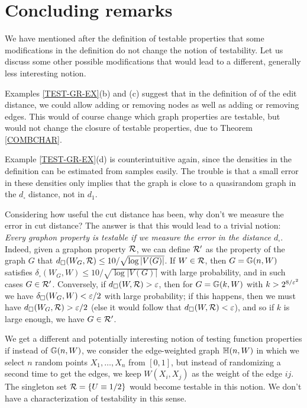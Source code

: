 \documentclass{article}
\begin{document}
\section{Concluding remarks}

We have mentioned after the definition of testable properties that
some modifications in the definition do not change the notion of
testability. Let us discuss some other possible modifications that
would lead to a different, generally less interesting notion.

Examples \ref{TEST-GR-EX}(b) and (c) suggest that in the definition
of of the edit distance, we could allow adding or removing nodes as
well as adding or removing edges. This would of course change which
graph properties are testable, but would not change the closure of
testable properties, due to Theorem \ref{COMBCHAR}.

Example \ref{TEST-GR-EX}(d) is counterintuitive again, since the
densities in the definition can be estimated from samples easily. The
trouble is that a small error in these densities only implies that
the graph is close to a quasirandom graph in the $d_\square$
distance, not in $d_1$.

Considering how useful the cut distance has been, why don't we
measure the error in cut distance? The answer is that this would lead
to a trivial notion: {\it Every graphon property is testable if we
measure the error in the distance $d_\square$}. Indeed, given a
graphon property $\mathcal{R}$, we can define $\mathcal{R}'$ as the property of the
graph $G$ that $d_\square(W_G,\mathcal{R})\le 10/\sqrt{\log |V(G)|}$. If
$W\in\mathcal{R}$, then $G={\mathbb G}(n,W)$ satisfies $\delta_\square(W_G,W)\le
10/\sqrt{\log |V(G)|}$ with large probability, and in such cases
$G\in\mathcal{R}'$. Conversely, if $d_\square(W,\mathcal{R})>\varepsilon$, then for
$G={\mathbb G}(k,W)$ with $k>2^{8/\varepsilon^2}$ we have
$\delta_\square(W_G,W)<\varepsilon/2$ with large probability; if this
happens, then we must have $d_\square(W_G,\mathcal{R})>\varepsilon/2$ (else it would
follow that $d_\square(W,\mathcal{R})<\varepsilon$), and so if $k$ is large enough,
we have $G\in\mathcal{R}'$.

We get a different and potentially interesting notion of testing
function properties if instead of ${\mathbb G}(n,W)$, we consider the
edge-weighted graph ${\mathbb H}(n,W)$ in which we select $n$ random points
$X_1,\dots,X_n$ from $[0,1]$, but instead of randomizing a second
time to get the edges, we keep $W(X_i,X_j)$ as the weight of the edge
$ij$. The singleton set $\mathcal{R}=\{U\equiv 1/2\}$ would become testable
in this notion. We don't have a characterization of testability in
this sense.
\end{document}
